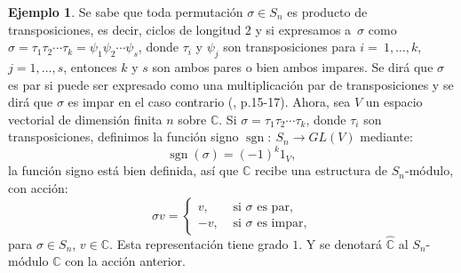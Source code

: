 \documentclass[12pt]{book}
\theoremstyle{definition}
\newtheorem{example}[theorem]{Ejemplo}
\newcounter{in}
\newcounter{ini}
\DeclareMathOperator{\sgn}{sgn}
\begin{document}
\begin{example}
Se sabe que toda permutación $\sigma \in S_{n}$ es producto de transposiciones, es decir, ciclos de longitud $2$ y si expresamos a~$\sigma$ como $\sigma =\tau_{1}\tau_{2}\cdots\tau_{k}=\psi_{1}\psi_{2}\cdots\psi_{s}$, donde $\tau_{i}$ y $\psi_{j}$ son transposiciones para
  $i=~1,\ldots,k$, $j=1,\ldots,s$, entonces $k$ y $s$
  son ambos pares o bien ambos impares. Se dirá que $\sigma$ es par si puede ser expresado como una multiplicación par de transposiciones y se dirá que $\sigma$ es impar en el caso contrario \normalfont(\cite{knapp2007basic}, p.15-17).  Ahora,
sea $V$ un espacio vectorial de dimensión finita $n$ sobre
  $\mathbb{C}$.  Si $\sigma = \tau_{1}\tau_{2}\cdots\tau_{k}$, donde $\tau_{i}$ son
  transposiciones, definimos la función signo
  $\sgn:~S_{n} \rightarrow GL(V)$
  mediante: $$\sgn(\sigma)=(-1)^{k}1_{V},$$ la función signo está bien
  definida, así que $\mathbb{C}$ recibe una estructura de
  $S_{n}$-módulo, con acción:
   \[
   \sigma v=
   \begin{cases}
     v, & \text{ si } \sigma \text{ es par,}\\
     -v, & \text{ si } \sigma \text{ es impar,}
   \end{cases}
   \]
   para $\sigma \in S_{n}$, $v\in \mathbb{C}$. Esta representación
   tiene grado $1$. Y se denotará $\hat{\mathbb{C}}$ al $S_{n}$-módulo
   $\mathbb{C}$ con la acción anterior.
\end{example}
\end{document}
